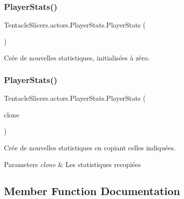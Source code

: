 \subsubsection{\texorpdfstring{Player\+Stats()}{PlayerStats()}\hspace{0.1cm}{\footnotesize\ttfamily [1/2]}}
{\footnotesize\ttfamily Tentacle\+Slicers.\+actors.\+Player\+Stats.\+Player\+Stats (\begin{DoxyParamCaption}{ }\end{DoxyParamCaption})}



Crée de nouvelles statistiques, initialisées à zéro. 

\mbox{\label{class_tentacle_slicers_1_1actors_1_1_player_stats_a5f056aab0dfb1739b8707db43d7561f9}} 
\subsubsection{\texorpdfstring{Player\+Stats()}{PlayerStats()}\hspace{0.1cm}{\footnotesize\ttfamily [2/2]}}
{\footnotesize\ttfamily Tentacle\+Slicers.\+actors.\+Player\+Stats.\+Player\+Stats (\begin{DoxyParamCaption}\item[{\hyperlink{class_tentacle_slicers_1_1actors_1_1_player_stats}{Player\+Stats}}]{clone }\end{DoxyParamCaption})}



Crée de nouvelles statistiques en copiant celles indiquées. 


\begin{DoxyParams}{Parameters}
{\em clone} & Les statistiques recopiées \\
\hline
\end{DoxyParams}


\subsection{Member Function Documentation}
\mbox{\label{class_tentacle_slicers_1_1actors_1_1_player_stats_a0d7e24093042f209364aa79e18de2864}} 
